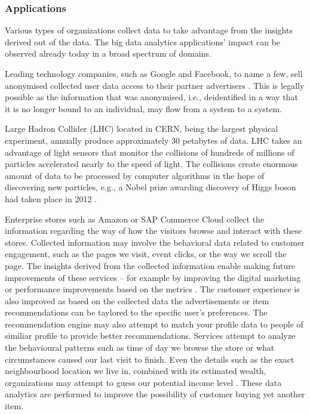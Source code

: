 \documentclass[a4paper,twoside,12pt]{book}
\begin{document}
\subsubsection{Applications}

Various types of organizations collect data to take advantage from the insights derived out of the data. The big data analytics applications' impact can be observed already today in a broad spectrum of domains. 


Leading technology companies, such as Google and Facebook, to name a few, sell anonymised collected user data access to their partner advertisers \cite{bib:big_data_in_practice}. This is legally possible as the information that was anonymised, i.e., deidentified in a way that it is no longer bound to an individual, may flow from a system to a system.

Large Hadron Collider (LHC) located in CERN, being the largest physical experiment, annually produce approximately 30 petabytes of data. LHC takes an advantage of light sensors that monitor the collisions of hundreds of millions of particles accelerated nearly to the speed of light. The collisions create enormous amount of data to be processed by computer algorithms in the hope of discovering new particles, e.g., a Nobel prize awarding discovery of Higgs boson had taken place in 2012 \cite{bib:cern}.

Enterprise stores such as Amazon or SAP Commerce Cloud collect the information regarding the way of how the visitors browse and interact with these stores. Collected information may involve the behavioral data related to customer engagement, such as the pages we visit, event clicks, or the way we scroll the page. The insights derived from the collected information enable making future improvements of these services – for example by improving the digital marketing or performance improvements based on the metrics \cite{bib:sap}. The customer experience is also improved as based on the collected data the advertisements or item recommendations can be taylored to the specific user's preferences. The recommendation engine may also attempt to match your profile data to people of similiar profile to provide better recommendations. Services attempt to analyze the behavioural patterns such as time of day we browse the store or what circumstances caused our last visit to finish. Even the details such as the exact neighbourhood location we live in, combined with its estimated wealth, organizations may attempt to guess our potential income level \cite{bib:big_data_in_practice}. These data analytics are performed to improve the possibility of customer buying yet another item.
\end{document}
